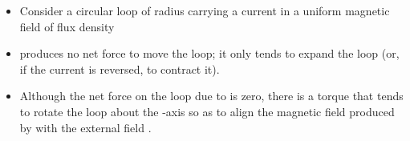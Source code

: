 \begin{ELunit}

\begin{itemize}
\tightlist
\item
  Consider a circular loop of radius  carrying a current  in a uniform magnetic field of flux density 
\end{itemize}



\begin{itemize}
\tightlist
\item
   produces no net force to move the loop; it only tends to expand the loop (or, if the current is reversed, to contract it).
\item
  Although the net force on the loop due to  is zero, there is a torque that tends to rotate the loop about the -axis so as to align the magnetic field produced by  with the external field .
\end{itemize}


\end{ELunit}

\begin{ELimportant}{}


\end{ELimportant}

